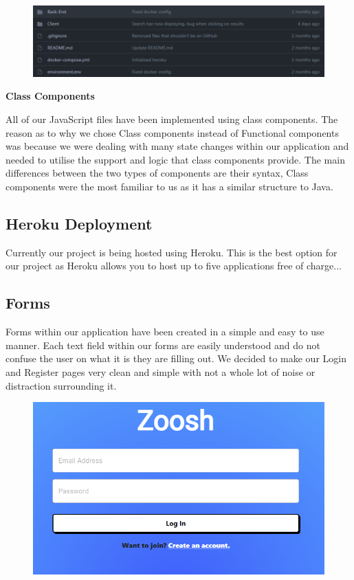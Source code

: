 \begin{figure}[H]
  \centering
  \includegraphics[scale=0.65]{img/structure.PNG}
  \label{fig:Project Github Structure}
\end{figure}


\item \textbf{Class Components}

All of our JavaScript files have been implemented using class components. The reason as to why we chose Class components instead of Functional components was because we were dealing with many state changes within our application and needed to utilise the support and logic that class components provide. The main differences between the two types of components are their syntax, Class components were the most familiar to us as it has a similar structure to Java.

\newline

\subsection{Heroku Deployment}

Currently our project is being hosted using Heroku. This is the best option for our project as Heroku allows you to host up to five applications free of charge...

\subsection{Forms}
Forms within our application have been created in a simple and easy to use manner. Each text field within our forms are easily understood and do not confuse the user on what it is they are filling out. We decided to make our Login and Register pages very clean and simple with not a whole lot of noise or distraction surrounding it. 

\begin{figure}[H]
  \centering
  \includegraphics[scale=0.45]{img/login.PNG}
  \label{fig:Login Screen}
\end{figure}

